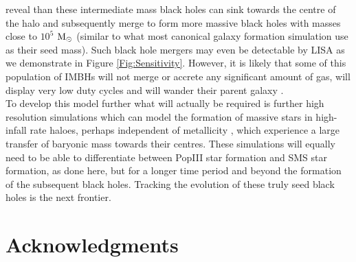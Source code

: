 \documentclass[twocolumn,iop,revtex4]{openjournal}
\newcommand{\msolar} {$\rm{M_{\odot}}~$}
\begin{document}
reveal than these intermediate mass black holes can sink towards the centre of the halo and subsequently merge to form more massive black holes with masses close to $10^5$ \msolar (similar to what most canonical galaxy formation
simulation use as their seed mass). Such black hole mergers may even be
detectable by LISA as we demonstrate in Figure \ref{Fig:Sensitivity}. However, it is likely that some of this population of IMBHs will not merge or accrete any significant amount of gas, will display very low duty cycles and will wander their parent galaxy \citep{Tremmel_2018, Reines_2020, Barausse_2020}.\\
\indent To develop this model further what will actually be required is further high
resolution simulations which can model the formation of massive stars in high-infall rate haloes,
perhaps independent of metallicity \citep{Chon_2020, Regan_2020a}, which experience
a large transfer of baryonic mass towards their centres. These simulations will equally need to
be able to differentiate between PopIII star formation and SMS star formation, as done here, but
for a longer time period and beyond the formation of the subsequent black holes.
Tracking the evolution of these truly seed black holes is the next frontier. 

\section*{Acknowledgments}
\end{document}
